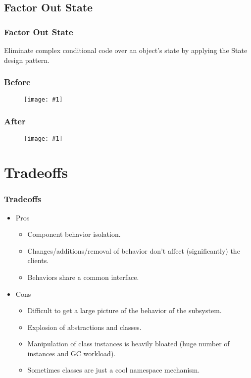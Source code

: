 \documentclass{beamer}
\newcommand{\putimage}[2] {
  \begin{figure}[H]
    \centering
    \texttt{[image: \#1]}
	\end{figure}
}
\begin{document}
\subsection{Factor Out State}
\begin{frame}
\frametitle{Factor Out State}
\huge Eliminate complex conditional code over an object’s state by applying the State design pattern.
\end{frame}
\begin{frame}
\frametitle{Before}
  \putimage{images/factor-out-state/before.png}{0.99}
\end{frame}
\begin{frame}
\frametitle{After}
  \putimage{images/factor-out-state/after.png}{0.90}
\end{frame}

\section{Tradeoffs}
\begin{frame}
\frametitle{Tradeoffs}
  \begin{itemize}
    \item Pros
      \begin{itemize}
        \item Component behavior isolation.
        \item Changes/additions/removal of behavior don't affect (significantly) the clients.
        \item Behaviors share a common interface.
      \end{itemize}
    \item Cons
      \begin{itemize}
        \item Difficult to get a large picture of the behavior of the subsystem.
        \item Explosion of abstractions and classes.
        \item Manipulation of class instances is heavily bloated (huge number of instances and GC workload).
        \item Sometimes classes are just a cool namespace mechanism.
      \end{itemize}
  \end{itemize}
\end{frame}
\end{document}

